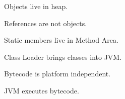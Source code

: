 \documentclass[11pt,a4paper]{book}
\begin{document}

\begin{rosettarule}

Objects live in heap.

\end{rosettarule}


\begin{rosettarule}

References are not objects.

\end{rosettarule}


\begin{rosettarule}

Static members live in Method Area.

\end{rosettarule}


\begin{rosettarule}

Class Loader brings classes into JVM.

\end{rosettarule}


\begin{rosettarule}

Bytecode is platform independent.

\end{rosettarule}


\begin{rosettarule}

JVM executes bytecode.

\end{rosettarule}

\end{document}
